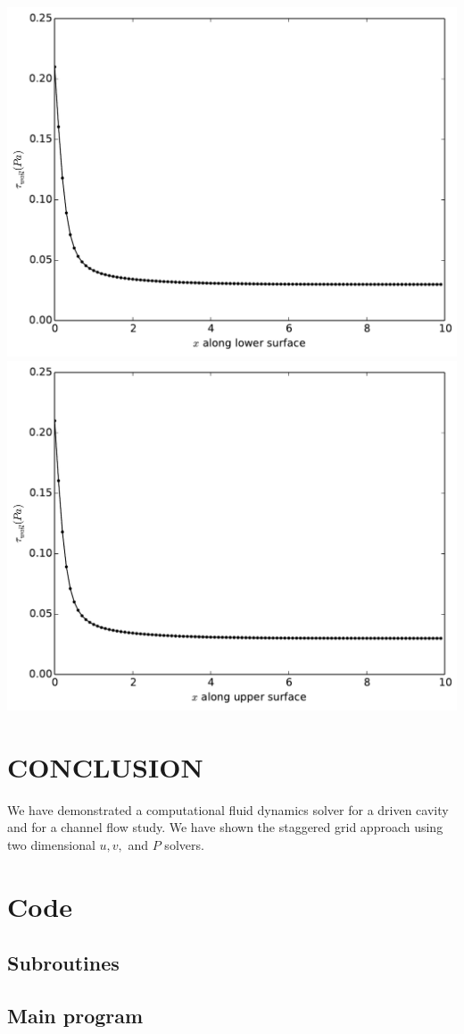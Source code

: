 \documentclass[cleanfoot,cleanhead,onecolumn,12pt,notitlepage]{asme2e}
\begin{document}
\includegraphics[width=0.4\linewidth]{../Channel/tau_lower.pdf}
\includegraphics[width=0.4\linewidth]{../Channel/tau_upper.pdf}






\section{CONCLUSION}

We have demonstrated a computational fluid dynamics solver for a driven cavity and for a channel flow study.  We have shown the staggered grid approach using two dimensional $u,v,$ and $P$ solvers.


%
%






\appendix

\section{Code}
\label{sec:code}

\subsection{Subroutines}

\subsection{Main program}

\end{document}
